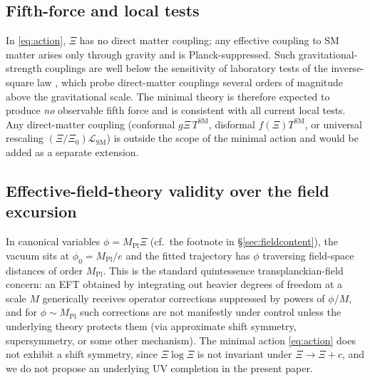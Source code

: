 \documentclass[11pt,reqno]{amsart}
\theoremstyle{plain}
\theoremstyle{definition}
\theoremstyle{remark}
\newcommand{\Pl}{\mathrm{Pl}}
\newcommand{\SM}{\mathrm{SM}}
\begin{document}
\subsection{Fifth-force and local tests}

In \eqref{eq:action}, $\Xi$ has no direct matter coupling; any effective
coupling to SM matter arises only through gravity and is Planck-suppressed.
Such gravitational-strength couplings are well below the sensitivity of
laboratory tests of the inverse-square law \cite{EotWash,MICROSCOPE},
which probe direct-matter couplings several orders of magnitude above
the gravitational scale. The minimal theory is therefore expected to
produce \emph{no} observable fifth force and is consistent with all
current local tests. Any direct-matter coupling (conformal
$g\Xi\, T^{\SM}$, disformal $f(\Xi) T^{\SM}$, or universal rescaling
$(\Xi/\Xi_0) \mathcal{L}_{\SM}$) is outside the scope of the minimal
action and would be added as a separate extension.

\subsection{Effective-field-theory validity over the field
excursion}\label{sec:eft}

In canonical variables $\phi = M_\Pl \Xi$ (cf.\ the footnote in
\S\ref{sec:fieldcontent}), the vacuum sits at $\phi_0 = M_\Pl/e$ and
the fitted trajectory has $\phi$ traversing field-space distances of
order $M_\Pl$. This is the standard quintessence transplanckian-field
concern: an EFT obtained by integrating out heavier degrees of freedom
at a scale $M$ generically receives operator corrections suppressed by
powers of $\phi/M$, and for $\phi \sim M_\Pl$ such corrections are not
manifestly under control unless the underlying theory protects them
(via approximate shift symmetry, supersymmetry, or some other
mechanism). The minimal action \eqref{eq:action} does not exhibit a
shift symmetry, since $\Xi\log\Xi$ is not invariant under
$\Xi \to \Xi + c$, and we do not propose an underlying UV completion in
the present paper.
\end{document}
